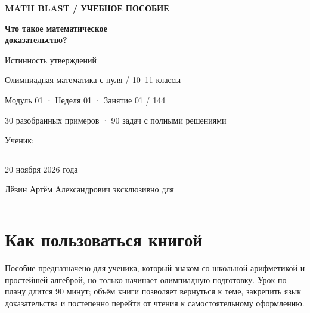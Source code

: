 \documentclass[11pt,a4paper,openany]{book}
\begin{document}
\let\cleardoublepage\clearpage
\thispagestyle{empty}
\begin{center}
\vspace*{23mm}
{\small\color{mbaccent}\bfseries MATH BLAST / УЧЕБНОЕ ПОСОБИЕ}\par
\vspace{21mm}
{\fontsize{26}{34}\selectfont\bfseries Что такое математическое\\[3mm] доказательство?}\par
\vspace{6mm}
{\fontsize{17}{24}\selectfont Истинность утверждений}\par
\vspace{20mm}
\par
\vspace{22mm}
{\small\color{mbmuted}Олимпиадная математика с нуля / 10–11 классы}\par
\vspace{3mm}
{\small Модуль 01 · Неделя 01 · Занятие 01 / 144}\par
\vspace{3mm}
{\small 30 разобранных примеров · 90 задач с полными решениями}\par
\vspace{17mm}
{\small Ученик:\enspace\rule[-.8ex]{85mm}{.4pt}}\par
\vspace{5mm}
{\small 20 ноября 2026 года}\par
\vfill
{\small\color{mbink}Лёвин Артём Александрович эксклюзивно для\enspace\rule[-.8ex]{70mm}{.4pt}}\par
\vspace{10mm}
\end{center}
\clearpage
\chapter*{Как пользоваться книгой}
Пособие предназначено для ученика, который знаком со школьной арифметикой и простейшей алгеброй, но только начинает олимпиадную подготовку. Урок по плану длится 90 минут; объём книги позволяет вернуться к теме, закрепить язык доказательства и постепенно перейти от чтения к самостоятельному оформлению.
\end{document}
